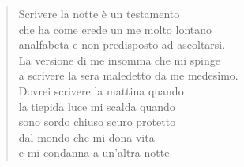 
\begin{verse}
    Scrivere la notte è un testamento\\
    che ha come erede un me molto lontano\\
    analfabeta e non predisposto ad ascoltarsi.\\
    La versione di me insomma che mi spinge\\
    a scrivere la sera maledetto da me medesimo.\\
    Dovrei scrivere la mattina quando\\
    la tiepida luce mi scalda quando\\
    sono sordo chiuso scuro protetto\\
    dal mondo che mi dona vita\\
    e mi condanna a un'altra notte.    
\end{verse}